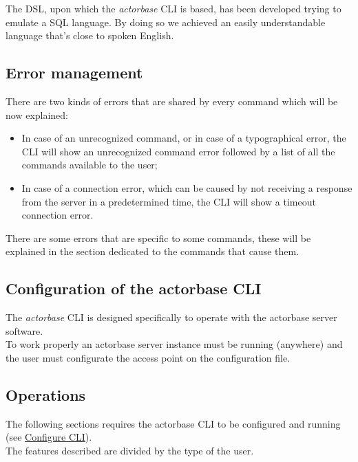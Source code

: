 \documentclass{scalatekids-article}
\begin{document}
The DSL, upon which the \textit{actorbase} CLI is based, has been developed
trying to emulate a SQL language. By doing so we achieved an easily
understandable language that's close to spoken English.

\subsection{Error management}

There are two kinds of errors that are shared by every command which will be
now explained:
\begin{itemize}
\item In case of an unrecognized command, or in case of a typographical error,
	the CLI will show an unrecognized command error followed by a list of all
	the commands available to the user;
\item In case of a connection error, which can be caused by not receiving a
	response from the server in a predetermined time, the CLI will show a
	timeout connection error.
\end{itemize}
There are some errors that are specific to some commands, these will be explained
in the section dedicated to the commands that cause them.



\subsection{Configuration of the actorbase CLI}
\label{sec:configurationcli}
The \textit{actorbase} CLI is designed specifically to operate 
with the actorbase server software.\\
To work properly an actorbase server instance must be running 
(anywhere) and the user must configurate the access point on the configuration file.

\subsection{Operations}

The following sections requires the actorbase CLI to be configured and 
running (see \hyperref[sec:configurationcli]{Configure CLI}).\\
The features described are divided by the type of the user.
\end{document}
